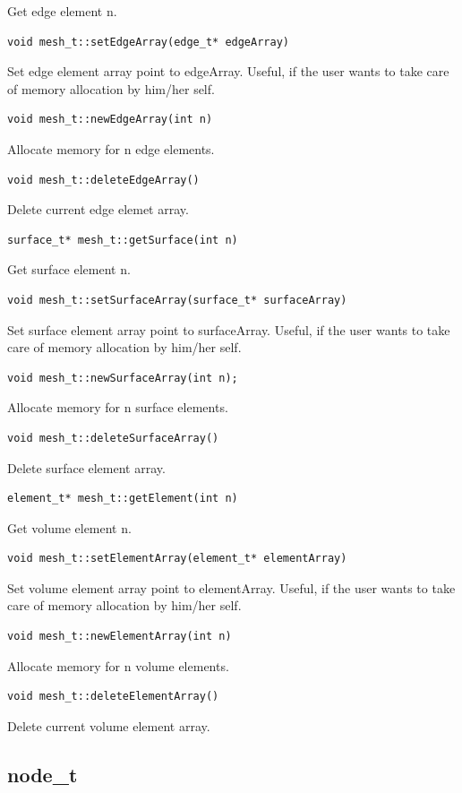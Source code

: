 \documentclass[a4paper,12pt]{article}
\begin{document}
Get edge element n.
\begin{verbatim}
void mesh_t::setEdgeArray(edge_t* edgeArray)
\end{verbatim}
Set edge element array point to edgeArray. Useful, if the user wants to take care of memory allocation by him/her self.
\begin{verbatim} 
void mesh_t::newEdgeArray(int n)
\end{verbatim}
Allocate memory for n edge elements.
\begin{verbatim}
void mesh_t::deleteEdgeArray()
\end{verbatim}
Delete current edge elemet array.
\begin{verbatim}
surface_t* mesh_t::getSurface(int n)
\end{verbatim}
Get surface element n.
\begin{verbatim}
void mesh_t::setSurfaceArray(surface_t* surfaceArray)
\end{verbatim}
Set surface element array point to surfaceArray. Useful, if the user wants to take care of memory allocation by him/her self.
\begin{verbatim} 
void mesh_t::newSurfaceArray(int n);
\end{verbatim}
Allocate memory for n surface elements.
\begin{verbatim}
void mesh_t::deleteSurfaceArray()
\end{verbatim}
Delete surface element array.
\begin{verbatim}
element_t* mesh_t::getElement(int n)
\end{verbatim}
Get volume element n.
\begin{verbatim}
void mesh_t::setElementArray(element_t* elementArray)
\end{verbatim}
Set volume element array point to elementArray. Useful, if the user wants to take care of memory allocation by him/her self.
\begin{verbatim} 
void mesh_t::newElementArray(int n)
\end{verbatim}
Allocate memory for n volume elements.
\begin{verbatim} 
void mesh_t::deleteElementArray()
\end{verbatim}
Delete current volume element array.

\subsection{node\_t}
\end{document}
